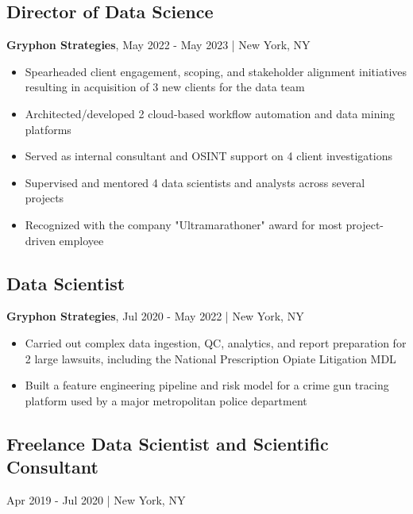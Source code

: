 \documentclass[11pt]{article}
\newenvironment{myitemize}
{ \begin{itemize}
	\setlength{\itemsep}{0pt}
	\setlength{\parskip}{0pt}
	\setlength{\parsep}{0pt}     }
{ \end{itemize}                  }
\begin{document}
\subsection*{Director of Data Science}
\vspace{-3truemm}

{\bfseries Gryphon Strategies}, May 2022 - May 2023 | New York, NY
\begin{myitemize}
	\item Spearheaded client engagement, scoping, and stakeholder alignment initiatives resulting in acquisition of 3 new clients for the data team
	\item Architected/developed 2 cloud-based workflow automation and data mining platforms
	\item Served as internal consultant and OSINT support on 4 client investigations
	\item Supervised and mentored 4 data scientists and analysts across several projects
	\item Recognized with the company "Ultramarathoner" award for most project-driven employee
\end{myitemize}

\subsection*{Data Scientist}
\vspace{-3truemm}

{\bfseries Gryphon Strategies}, Jul 2020 - May 2022 | New York, NY
\begin{myitemize}
	\item Carried out complex data ingestion, QC, analytics, and report preparation for 2 large lawsuits, including the National Prescription Opiate Litigation MDL
	\item Built a feature engineering pipeline and risk model for a crime gun tracing platform used by a major metropolitan police department
\end{myitemize}

\subsection*{Freelance Data Scientist and Scientific Consultant}
\vspace{-3truemm}
Apr 2019 - Jul 2020 | New York, NY
\end{document}

